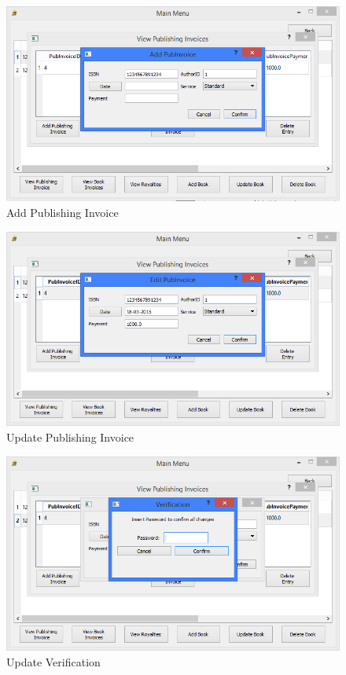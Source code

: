 \begin{figure}[H]
    \caption{Add Publishing Invoice} \label{fig:AddPubInvoice}
    \includegraphics[width=\textwidth]{./Maintenance/UserInterface/AddPubInvoice.png}
\end{figure}

\begin{figure}[H]
    \caption{Update Publishing Invoice} \label{fig:UpdatePubInvoice}
    \includegraphics[width=\textwidth]{./Maintenance/UserInterface/UpdatePubInvoice.png}
\end{figure}

\begin{figure}[H]
    \caption{Update Verification} \label{fig:UpdatePubInvoiceVerify}
    \includegraphics[width=\textwidth]{./Maintenance/UserInterface/UpdatePubInvoiceVerify.png}
\end{figure}

